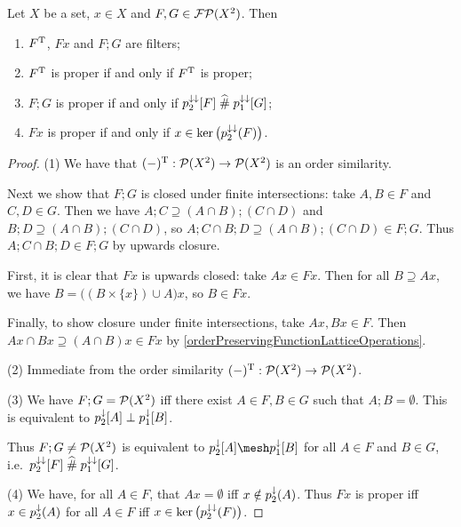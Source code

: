 \begin{lemma} \label{filterOperationsOnRelationFilters}
Let $X$ be a set, $x\in X$ and $F,G\in\operatorname{\mathcal{FP}}(X^2)$. Then
\begin{enumerate}
\item $F^{\mathrm{T}}$, $Fx$ and $F;G$ are filters;
\item $F^{\mathrm{T}}$ is proper \textup{if and only if} $F^{\mathrm{T}}$ is proper;
\item $F;G$ is proper \textup{if and only if} $p_2^{\downarrow\downarrow}[F]\mathrel{\widehat{\#}} p_1^{\downarrow\downarrow}[G]$;
\item $Fx$ is proper \textup{if and only if} $x\in\ker\big(p_2^{\downarrow\downarrow}(F)\big)$.
\end{enumerate}
\end{lemma}
\begin{proof}
(1) We have that $(-)^{\mathrm{T}}:\operatorname{\mathcal{P}}(X^2)\to\operatorname{\mathcal{P}}(X^2)$ is an order similarity. 

Next we show that $F;G$ is closed under finite intersections: take $A,B\in F$ and $C,D\in G$. Then we have $A;C \supseteq (A\cap B);(C\cap D)$ and $B;D \supseteq (A\cap B);(C\cap D)$, so $A;C \cap B;D \supseteq (A\cap B);(C\cap D) \in F;G$. Thus $A;C \cap B;D\in F;G$ by upwards closure.

First, it is clear that $Fx$ is upwards closed: take $Ax\in Fx$. Then for all $B\supseteq Ax$, we have $B = \big((B\times\{x\})\cup A\big)x$, so $B\in Fx$.

Finally, to show closure under finite intersections, take $Ax, Bx\in F$. Then $Ax\cap Bx \supseteq (A\cap B)x \in Fx$ by \ref{orderPreservingFunctionLatticeOperations}.

(2) Immediate from the order similarity $(-)^{\mathrm{T}}:\operatorname{\mathcal{P}}(X^2)\to\operatorname{\mathcal{P}}(X^2)$.

(3) We have $F;G = \operatorname{\mathcal{P}}(X^2)$ iff there exist $A\in F,B\in G$ such that $A;B = \emptyset$. This is equivalent to $p_2^{\downarrow}[A]\perp p_1^{\downarrow}[B]$.

Thus $F;G \neq \operatorname{\mathcal{P}}(X^2)$ is equivalent to $p_2^{\imf}[A]\mesh p_1^{\imf}[B]$ for all $A\in F$ and $B\in G$, i.e.\ $p_2^{\downarrow\downarrow}[F]\mathrel{\widehat{\#}} p_1^{\downarrow\downarrow}[G]$.

(4) We have, for all $A\in F$, that $Ax = \emptyset$ iff $x\notin p_2^\downarrow(A)$. Thus $Fx$ is proper iff $x\in p_2^\downarrow(A)$ for all $A\in F$ iff $x\in \ker\big(p_2^{\downarrow\downarrow}(F)\big)$.
\end{proof}

